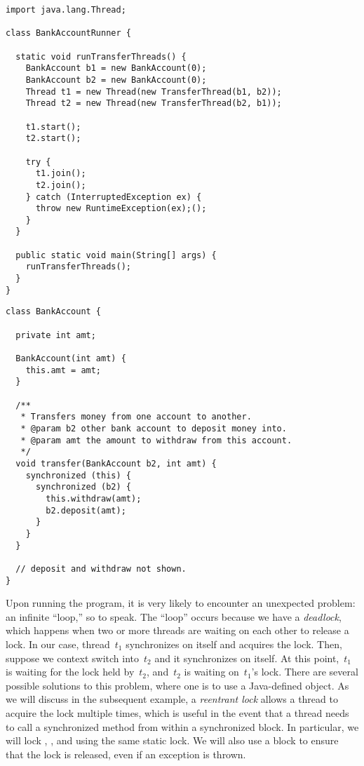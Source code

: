 \newpage
\begin{lstlisting}[language=MyJava]
import java.lang.Thread;

class BankAccountRunner {

  static void runTransferThreads() {
    BankAccount b1 = new BankAccount(0);
    BankAccount b2 = new BankAccount(0);
    Thread t1 = new Thread(new TransferThread(b1, b2));
    Thread t2 = new Thread(new TransferThread(b2, b1));

    t1.start();
    t2.start();

    try {
      t1.join();
      t2.join();
    } catch (InterruptedException ex) { 
      throw new RuntimeException(ex);(); 
    }
  }

  public static void main(String[] args) {
    runTransferThreads();
  }
}
\end{lstlisting}

\begin{lstlisting}[language=MyJava]
class BankAccount {

  private int amt;

  BankAccount(int amt) { 
    this.amt = amt; 
  }

  /**
   * Transfers money from one account to another.
   * @param b2 other bank account to deposit money into.
   * @param amt the amount to withdraw from this account.
   */
  void transfer(BankAccount b2, int amt) {
    synchronized (this) {
      synchronized (b2) {
        this.withdraw(amt);
        b2.deposit(amt);
      }
    }
  }

  // deposit and withdraw not shown.
}
\end{lstlisting}

Upon running the program, it is very likely to encounter an unexpected problem: an infinite ``loop,'' so to speak. 
The ``loop'' occurs because we have a \emph{deadlock}, which happens when two or more threads are waiting on each other to release a lock. 
In our case, thread~$t_1$ synchronizes on itself and acquires the lock. 
Then, suppose we context switch into~$t_2$ and it synchronizes on itself. 
At this point,~$t_1$ is waiting for the lock held by~$t_2$, and~$t_2$ is waiting on~$t_1$'s lock. 
There are several possible solutions to this problem, where one is to use a Java-defined  object. 
As we will discuss in the subsequent example, a \emph{reentrant lock} allows a thread to acquire the lock multiple times, which is useful in the event that a thread needs to call a synchronized method from within a synchronized block. 
In particular, we will lock , , and  using the same static lock. 
We will also use a  block to ensure that the lock is released, even if an exception is thrown.

